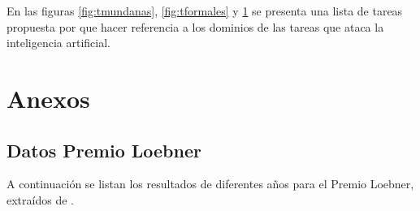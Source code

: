 \documentclass{article}
\begin{document}
\begin{figure}[h]
\begin{minipage}{.33\textwidth}
  \label{fig:texpertas}
\end{minipage}
\end{figure}

En las figuras \ref{fig:tmundanas}, \ref{fig:tformales} y \ref{fig:texpertas} se presenta una lista de tareas propuesta por \cite{rich2009} que hacer referencia a los dominios de las tareas que ataca la inteligencia artificial.



\section{Anexos}
\subsection{Datos Premio Loebner}
\label{sec:an1}
A continuaci\'on se listan los resultados de diferentes a\~nos para el Premio Loebner, extra\'idos de \cite{loebner1}.
\end{document}
